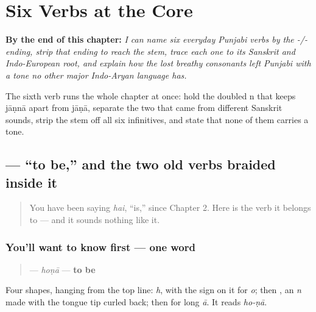 
\chapter{Six Verbs at the Core}
\label{ch:pa-core-verbs}

\begin{chapteropening}
\textbf{By the end of this chapter:} \emph{I can name six everyday Punjabi verbs by the -/- ending, strip that ending to reach the stem, trace each one to its Sanskrit and Indo-European root, and explain how the lost breathy consonants left Punjabi with a tone no other major Indo-Aryan language has.}

The sixth verb runs the whole chapter at once: hold the doubled n that keeps jāṇnā apart from jāṇā, separate the two  that came from different Sanskrit sounds, strip the stem off all six infinitives, and state that none of them carries a tone.
\end{chapteropening}

\section[\texorpdfstring{\pa{ਹੋਣਾ} (hoṇā)}{ਹੋਣਾ (hoṇā)}]{ — “to be,” and the two old verbs braided inside it}

\label{lesson:PA-C07-hona}



\begin{quote}
You have been saying \textbf{} \emph{hai}, “is,” since Chapter 2. Here is the verb it belongs to — and it sounds nothing like it.
\end{quote}

\subsection*{You'll want to know first — one word}
\begin{quote}
\textbf{} — \emph{hoṇā} — \textbf{to be}
\end{quote}

Four shapes, hanging from the top line: \textbf{} \emph{h}, with the \textbf{} sign on it for \emph{o}; then \textbf{}, an \emph{n} made with the tongue tip curled back; then \textbf{} for long \emph{ā}. It reads \emph{ho-ṇā}.

